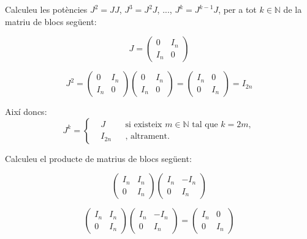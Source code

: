 \begin{exercise}[1.8.6]
    Calculeu les potències $J^2=JJ$, $J^3 = J^2J$, ..., $J^k = J^{k-1}J$, per a tot $k\in\mathbb{N}$ de la matriu de blocs següent:

    \[
    J =
    \left(
    \begin{array}{c|c}
    0 & I_n \\ \hline
    I_n & 0
    \end{array}
    \right)
    \]

\end{exercise}

\begin{solution}
    \[
    J^2 =
    \left(
    \begin{array}{c|c}
    0 & I_n \\ \hline
    I_n & 0
    \end{array}
    \right) \left(
    \begin{array}{c|c}
    0 & I_n \\ \hline
    I_n & 0
    \end{array}
    \right) =  \left(
    \begin{array}{c|c}
    I_n & 0 \\ \hline
    0 & I_n
    \end{array}
    \right)=I_{2n}
    \]

    Així doncs:
    $$J^k = \left\{
        \begin{aligned}
        &J &&\text{si existeix } m \in \mathbb{N} \text{ tal que } k = 2m,\\
        &I_{2n}&&\text{, altrament.}
        \end{aligned}
    \right.
    $$
\end{solution}


\begin{exercise}[1.8.7]
    Calculeu el producte de matrius de blocs següent:

    \[
    \left(
    \begin{array}{c|c}
    I_n & I_n \\ \hline
    0 & I_n 
    \end{array}
    \right)    
    \left(
    \begin{array}{c|c}
    I_n & -I_n \\ \hline
    0 & I_n
    \end{array}
    \right)
    \]

\end{exercise}

\begin{solution}
       \[
    \left(
    \begin{array}{c|c}
    I_n & I_n \\ \hline
    0 & I_n 
    \end{array}
    \right)    
    \left(
    \begin{array}{c|c}
    I_n & -I_n \\ \hline
    0 & I_n
    \end{array}
    \right) = \left(
    \begin{array}{c|c}
    I_n & 0 \\ \hline
    0 & I_n
    \end{array}
    \right)
    \] 
\end{solution}


